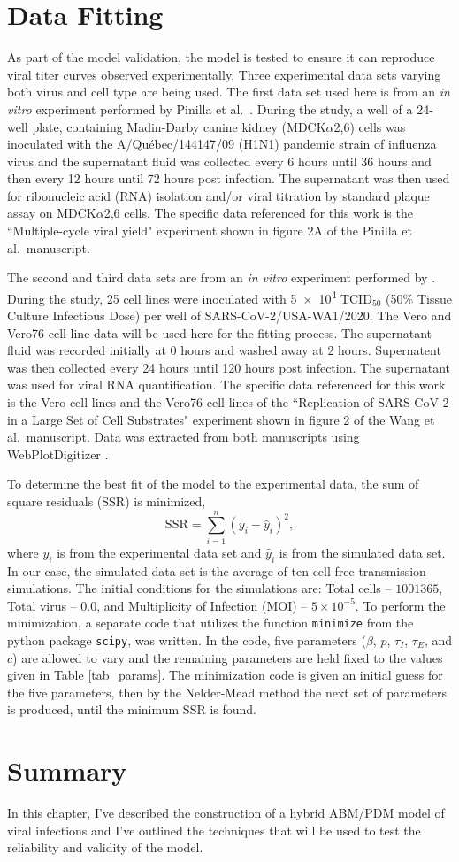 \section{Data Fitting} \label{Data_Fitting}

As part of the model validation, the model is tested to ensure it can reproduce viral titer curves observed experimentally. Three experimental data sets varying both virus and cell type are being used. The first data set used here is from an \emph{in vitro} experiment performed by Pinilla et al.\ \citep{pinilla12}. During the study, a well of a 24-well plate, containing Madin-Darby canine kidney (MDCK$\alpha$2,6) cells was inoculated with the A/Qu\'{e}bec/144147/09 (H1N1) pandemic strain of influenza virus and the supernatant fluid was collected every 6 hours until 36 hours and then every 12 hours until 72 hours post infection. The supernatant was then used for ribonucleic acid (RNA) isolation and/or viral titration by standard plaque assay on MDCK$\alpha$2,6 cells. The specific data referenced for this work is the ``Multiple-cycle viral yield" experiment shown in figure 2A of the Pinilla et al.\ manuscript. 

The second and third data sets are from an \emph{in vitro} experiment performed by \cite{wang_susceptibility_2021}. During the study, 25 cell lines were inoculated with \num{5e4} TCID$_{50}$ (50\% Tissue Culture Infectious Dose) per well of  SARS-CoV-2/USA-WA1/2020. The Vero and Vero76 cell line data will be used here for the fitting process. The supernatant fluid was recorded initially at 0 hours and washed away at 2 hours. Supernatent was then collected every 24 hours until 120 hours post infection. The supernatant was used for viral RNA quantification. The specific data referenced for this work is the Vero cell lines and the Vero76 cell lines of the ``Replication of SARS-CoV-2 in a Large Set of Cell Substrates" experiment shown in figure 2 of the Wang et al.\ manuscript. Data was extracted from both manuscripts using WebPlotDigitizer \citep{WebPlotDigitizer}. 

To determine the best fit of the model to the experimental data, the sum of square residuals (SSR) is minimized, $$\mathrm{SSR} = \sum_{i=1}^{n} (y_i - \hat y_i)^{2},$$ where $y_i$ is from the experimental data set and $\hat y_i$ is from the simulated data set. In our case, the simulated data set is the average of ten cell-free transmission simulations. The initial conditions for the simulations are: Total cells -- $1001365$, Total virus -- $0.0$, and Multiplicity of Infection (MOI) -- $5\times 10^{-5}$. To perform the minimization, a separate code that utilizes the function \texttt{minimize} from the python package \texttt{scipy}, was written. In the code, five parameters ($\beta$, $p$, $\tau_I$, $\tau_E$, and $c$) are allowed to vary and the remaining parameters are held fixed to the values given in Table \ref{tab_params}. The minimization code is given an initial guess for the five parameters, then by the Nelder-Mead method the next set of parameters is produced, until the minimum SSR is found.

\section{Summary}

In this chapter, I've described the construction of a hybrid ABM/PDM model of viral infections and I've outlined the techniques that will be used to test the reliability and validity of the model. 

